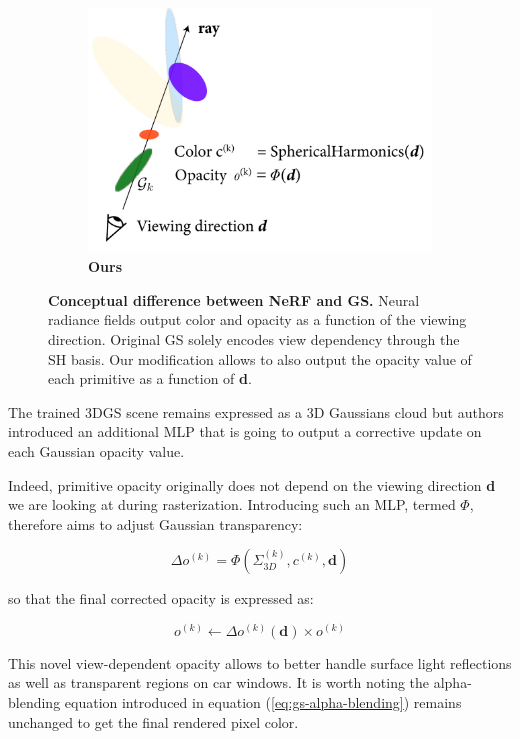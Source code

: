 \begin{figure}[htpb!]
\begin{subfigure}[b]{0.31\linewidth}
    \includegraphics[width=\linewidth]{images/gaussiansplatting/gs_NEW.png}
    \caption{\textbf{Ours}}
    \label{fig:gs-ray}
  \end{subfigure}
  \caption{\textbf{Conceptual difference between NeRF and GS.} Neural radiance fields output color and opacity as a function of the viewing direction. Original \ac{GS} solely encodes view dependency through the \ac{SH} basis. Our modification allows to also output the opacity value of each primitive as a function of \textbf{d}.}
  \label{fig:gs-nerf}
\end{figure}

The trained 3D\ac{GS} scene remains expressed as a 3D Gaussians cloud but authors introduced an additional \ac{MLP} that is going to output a corrective update on each Gaussian opacity value. 

Indeed, primitive opacity originally does not depend on the viewing direction \textbf{d} we are looking at during rasterization. Introducing such an \ac{MLP}, termed $\Phi$, therefore aims to adjust Gaussian transparency: 

\begin{equation}
\Delta o^{(k)} = \Phi(\Sigma_{3D}^{(k)},c^{(k)},\textbf{d}) 
\end{equation}

so that the final corrected opacity is expressed as: 

\begin{equation}
o^{(k)} \gets \Delta o^{(k)}(\textbf{d}) \times o^{(k)} 
\end{equation}

This novel view-dependent opacity allows to better handle surface light reflections as well as transparent regions on car windows. It is worth noting the alpha-blending equation introduced in equation (\ref{eq:gs-alpha-blending}) remains unchanged to get the final rendered pixel color.

